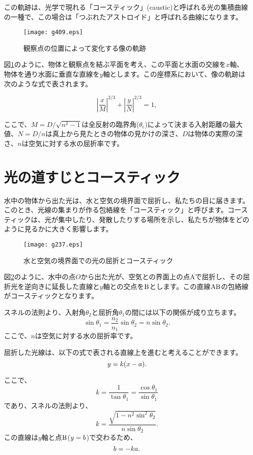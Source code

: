 \documentclass[twocolumn]{article}
\begin{document}
	この軌跡は、光学で現れる「コースティック」(caustic)と呼ばれる光の集積曲線の一種で、この場合は「つぶれたアストロイド」と呼ばれる曲線になります。
	
	\begin{figure}[h]
		\centering
		\texttt{[image: g409.eps]} \hfill\null
		\caption{観察点の位置によって変化する像の軌跡}
		\label{fig:caustic}
	\end{figure}
	
	図\ref{fig:caustic}のように、物体と観察点を結ぶ平面を考え、この平面と水面の交線を$x$軸、物体を通り水面に垂直な直線を$y$軸とします。この座標系において、像の軌跡は次のような式で表されます。
	
	$$ \left| \dfrac{x}{M} \right| ^ {2/3} 
	+ \left| \dfrac{y}{N} \right| ^ {2/3} = 1,$$
	
	ここで、$M = D/\sqrt{n^2 - 1}$は全反射の臨界角($\theta_{\mathrm{c}}$)によって決まる入射距離の最大値、$N = D/n$は真上から見たときの物体の見かけの深さ、$D$は物体の実際の深さ、$n$は空気に対する水の屈折率です。
	
	\section{光の道すじとコースティック}
	
	水中の物体から出た光は、水と空気の境界面で屈折し、私たちの目に届きます。このとき、光線の集まりが作る包絡線を「コースティック」と呼びます。コースティックは、光が集中したり、発散したりする場所を示し、私たちが物体をどのように見るかに大きく影響します。
	
	\begin{figure}[ht]
		\centering
		\texttt{[image: g237.eps]}
		\caption{水と空気の境界面での光の屈折とコースティック}
		\label{fig:geometry}
	\end{figure}
	
	図\ref{fig:geometry}のように、水中の点$O$から出た光が、空気との界面上の点Aで屈折し、その屈折光を逆向きに延長した直線と$y$軸との交点を${\mathrm{{B}}}$とします。この直線${\mathrm{{A}{B}}}$の包絡線がコースティックとなります。
	
	スネルの法則より、入射角$\theta_2$と屈折角$\theta_1$の間には以下の関係が成り立ちます。
	$$ \sin\theta_1 = \frac{n_2}{n_1} \sin\theta_2 = n\sin\theta_2.$$
	ここで、$n$は空気に対する水の屈折率です。
	
	屈折した光線は、以下の式で表される直線上を進むと考えることができます。
	$$y=k(x-{a}).$$
	
	ここで、
	$$k=\dfrac{1}{\tan\theta_1}=\dfrac{\cos\theta_1}{\sin\theta_1}$$
	であり、スネルの法則より、
	$$k=\dfrac{\sqrt{1-n^2\sin^2\theta_2}}{n\sin\theta_2}.$$
	この直線は$y$軸と点$\mathrm{{B}}$($y={b}$)で交わるため、
	$${b} = -k{a}.$$
	
\end{document}
